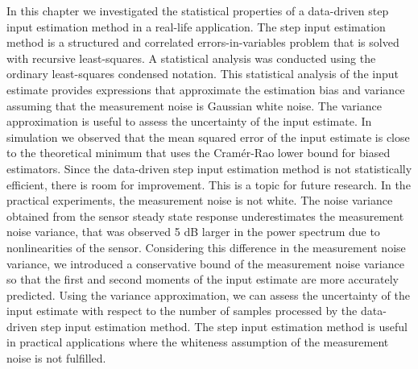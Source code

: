 In this chapter we investigated the statistical properties of a data-driven step input estimation method in a real-life application.
The step input estimation method is a structured and correlated errors-in-variables problem that is solved with recursive least-squares.
A statistical analysis was conducted using the ordinary least-squares condensed notation. 
This statistical analysis of the input estimate provides expressions that approximate the estimation bias and variance assuming that the measurement noise is Gaussian white noise. 
The variance approximation is useful to assess the uncertainty of the input estimate.
In simulation we observed that the mean squared error of the input estimate is close to the theoretical minimum that uses the Cram\'er-Rao lower bound for biased estimators.
Since the data-driven step input estimation method is not statistically efficient, there is room for improvement. This is a topic for future research.
In the practical experiments, the measurement noise is not white.
The noise variance obtained from the sensor steady state response underestimates the measurement noise variance, that was observed 5 dB larger in the power spectrum due to nonlinearities of the sensor.
Considering this difference in the measurement noise variance, we introduced a conservative bound of the measurement noise variance so that the first and second moments of the input estimate are more accurately predicted.
Using the variance approximation, we can assess the uncertainty of the input estimate with respect to the number of samples processed by the data-driven step input estimation method.
The step input estimation method is useful in practical applications where the whiteness assumption of the measurement noise is not fulfilled. 


\newpage

